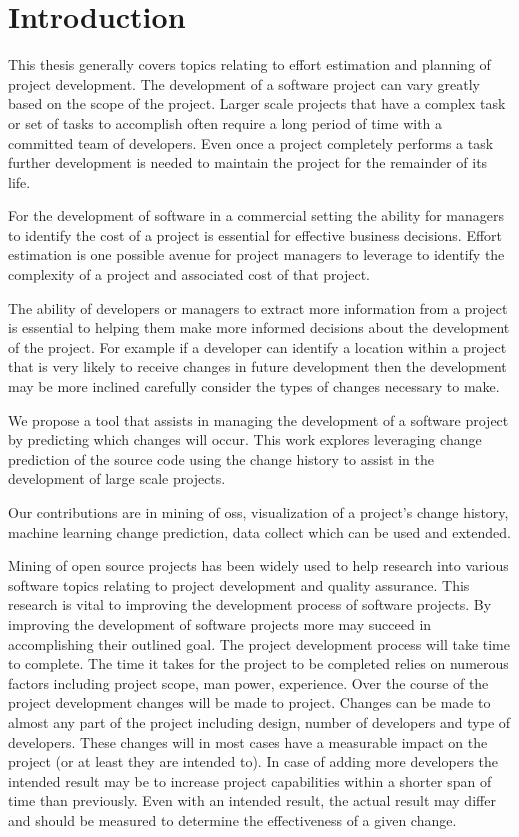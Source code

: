 \chapter{Introduction}
\label{chap:introduction}


This thesis generally covers topics relating to effort estimation and planning of project development. The development of a software project can vary greatly based on the scope of the project. Larger scale projects that have a complex task or set of tasks to accomplish often require a long period of time with a committed team of developers. Even once a project completely performs a task further development is needed to maintain the project for the remainder of its life.

For the development of software in a commercial setting the ability for managers to identify the cost of a project is essential for effective business decisions. Effort estimation is one possible avenue for project managers to leverage to identify the complexity of a project and associated cost of that project.

The ability of developers or managers to extract more information from a project is essential to helping them make more informed decisions about the development of the project. For example if a developer can identify a location within a project that is very likely to receive changes in future development then the development may be more inclined carefully consider the types of changes necessary to make.

We propose a tool that assists in managing the development of a software project by predicting which changes will occur. This work explores leveraging change prediction of the source code using the change history to assist in the development of large scale projects.

Our contributions are in mining of \gls{oss}, visualization of a project's change history, machine learning change prediction, data collect which can be used and extended.


Mining of open source projects has been widely used to help research into various software topics relating to project development and quality assurance. This research is vital to improving the development process of software projects. By improving the development of software projects more may succeed in accomplishing their outlined goal. The project development process will take time to complete. The time it takes for the project to be completed relies on numerous factors including project scope, man power, experience. Over the course of the project development changes will be made to project. Changes can be made to almost any part of the project including design, number of developers and type of developers. These changes will in most cases have a measurable impact on the project (or at least they are intended to). In case of adding more developers the intended result may be to increase project capabilities within a shorter span of time than previously. Even with an intended result, the actual result may differ and should be measured to determine the effectiveness of a given change.

